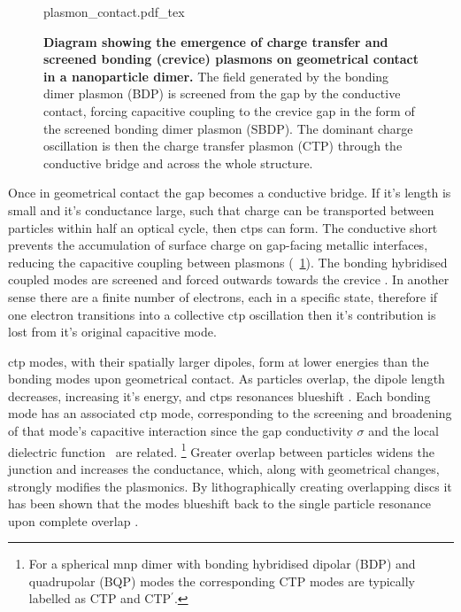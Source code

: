 \documentclass{article}
\begin{document}
\begin{figure}[bt]
\centering
\fontsize{10pt}{1em}\selectfont
\def\svgwidth{0.65\textwidth}
{plasmon_contact.pdf_tex}
\caption[Diagram showing the emergence of charge transfer and screened bonding (crevice) plasmons on geometrical contact in a nanoparticle dimer]{\textbf{Diagram showing the emergence of charge transfer and screened bonding (crevice) plasmons on geometrical contact in a nanoparticle dimer.} The field generated by the bonding dimer plasmon (BDP) is screened from the gap by the conductive contact, forcing capacitive coupling to the crevice gap in the form of the screened bonding dimer plasmon (SBDP). The dominant charge oscillation is then the charge transfer plasmon (CTP) through the conductive bridge and across the whole structure.}
\label{fig:plasmon_contact}
\end{figure}

Once in geometrical contact the gap becomes a conductive bridge. If it's length is small and it's conductance large, such that charge can be transported between particles within half an optical cycle, then \glspl{ctp} can form. The conductive short prevents the accumulation of surface charge on gap-facing metallic interfaces, reducing the capacitive coupling between plasmons (\figurename~\ref{fig:plasmon_contact}). The bonding hybridised coupled modes are screened and forced outwards towards the crevice \cite{romero2006, perez2010, tserkezis2014}. In another sense there are a finite number of electrons, each in a specific state, therefore if one electron transitions into a collective \gls{ctp} oscillation then it's contribution is lost from it's original capacitive mode.

\gls{ctp} modes, with their spatially larger dipoles, form at lower energies than the bonding modes upon geometrical contact. As particles overlap, the dipole length decreases, increasing it's energy, and \glspl{ctp} resonances blueshift \cite{romero2006}. Each bonding mode has an associated \gls{ctp} mode, corresponding to the screening and broadening of that mode's capacitive interaction since the gap conductivity $\sigma$ and the local dielectric function \dielectric\ are related.%
\footnote{For a spherical \gls{mnp} dimer with bonding hybridised dipolar (BDP) and quadrupolar (BQP) modes the corresponding CTP modes are typically labelled as CTP and CTP$^\prime$.}
Greater overlap between particles widens the junction and increases the conductance, which, along with geometrical changes, strongly modifies the plasmonics. By lithographically creating overlapping discs it has been shown that the modes blueshift back to the single particle resonance upon complete overlap \cite{atay2004, lassiter2008}.
\end{document}
